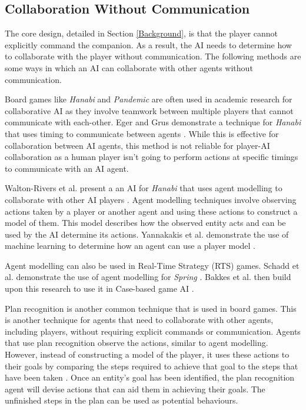 \documentclass{IEEEtran}
\begin{document}
\subsection{Collaboration Without Communication}
\label{Communication}

The core design, detailed in Section \ref{Background}, is that the player cannot explicitly command the companion. As a result, the AI needs to determine how to collaborate with the player without communication. The following methods are some ways in which an AI can collaborate with other agents without communication.

Board games like \textit{Hanabi} and \textit{Pandemic} are often used in academic research for collaborative AI as they involve teamwork between multiple players that cannot communicate with each-other. Eger and Grus demonstrate a technique for \textit{Hanabi} that uses timing to communicate between agents \cite{WaitASecond2019}. While this is effective for collaboration between AI agents, this method is not reliable for player-AI collaboration as a human player isn't going to perform actions at specific timings to communicate with an AI agent.

Walton-Rivers et al. present a an AI for \textit{Hanabi} that uses agent modelling to collaborate with other AI players \cite{EvaluatingHanabiAgents}. Agent modelling techniques involve observing actions taken by a player or another agent and using these actions to construct a model of them. This model describes how the observed entity acts and can be used by the AI determine its actions. Yannakakis et al. demonstrate the use of machine learning to determine how an agent can use a player model \cite{yannakakis2013playermodelling}.

Agent modelling can also be used in Real-Time Strategy (RTS) games. Schadd et al. demonstrate the use of agent modelling for \textit{Spring} \cite{OpponentModellingRTS2007}. Bakkes et al. then build upon this research to use it in Case-based game AI \cite{bakkes2009opponentmodelling}.


Plan recognition is another common technique that is used in board games. This is another technique for agents that need to collaborate with other agents, including players, without requiring explicit commands or communication. Agents that use plan recognition observe the actions, similar to agent modelling. However, instead of constructing a model of the player, it uses these actions to their goals by comparing the steps required to achieve that goal to the steps that have been taken \cite{GeneratingCollabBehaviourPlanRecognition2016}. Once an entity’s goal has been identified, the plan recognition agent will devise actions that can aid them in achieving their goals. The unfinished steps in the plan can be used as potential behaviours.
\end{document}
